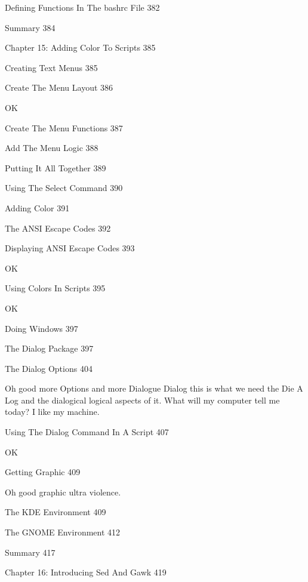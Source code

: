 Defining Functions In The bashrc File 382



Summary 384



Chapter 15: Adding Color To Scripts 385



Creating Text Menus 385



Create The Menu Layout 386

OK

Create The Menu Functions 387



Add The Menu Logic 388



Putting It All Together 389



Using The Select Command 390



Adding Color 391



The ANSI Escape Codes 392



Displaying ANSI Escape Codes 393

OK

Using Colors In Scripts 395

OK

Doing Windows 397



The Dialog Package 397



The Dialog Options 404

Oh good more Options and more Dialogue Dialog this is what we need the Die A Log and the dialogical logical aspects of it. What will my computer tell me today? I like my machine.

Using The Dialog Command In A Script 407

OK

Getting Graphic 409

Oh good graphic ultra violence.

The KDE Environment 409



The GNOME Environment 412



Summary 417



Chapter 16: Introducing Sed And Gawk 419



